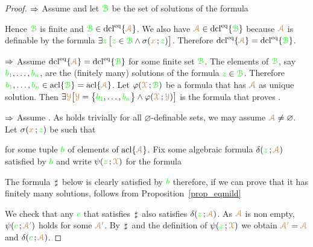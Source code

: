 \begin{proof}$\IMP$ Assume  and let ${\gr\B}$ be the set of solutions of the formula


Hence ${\gr\B}$ is finite and ${\gr\B}\in\dcl^\eq\{{\vl\Aa}\}$.
We also have ${\vl\Aa}\in\dcl^\eq\{{\gr\B}\}$ because ${\vl\Aa}$ is definable by the formula $\E{\gr z}\,\big[{\gr z}\in {\gr\B}\wedge \sigma({\mr x}\,;{\gr z})\big]$.
Therefore $\dcl^\eq\{{\vl\Aa}\}=\dcl^\eq\{{\gr\B}\}$.

$\IMP$ Assume $\dcl^\eq\{{\vl\Aa}\}=\dcl^\eq\{{\gr\B}\}$ for some finite set ${\gr\B}$.
The elements of ${\gr\B}$, say ${\gr b_1},\dots,{\gr b_n}$, are the (finitely many) solutions of the formula ${\gr z}\in{\gr\B}$.
Therefore ${\gr b_1},\dots,{\gr b_n}\in\acl\{{\gr\B}\}=\acl\{{\vl\Aa}\}$.
Let $\phi({\vl\X}\,;{\gr\B})$ be a formula that has ${\vl\Aa}$ as unique solution.
Then $\E{\vl\Y} \big[{\vl\Y}=\big\{{\gr b_1},\dots,{\gr b_n}\big\}\wedge \phi({\vl\X}\,;{\vl\Y})\big]$ is the formula that proves .

$\IMP$ Assume .
As  holds trivially for all $\varnothing$-definable sets, we may assume ${\vl\Aa}\neq\varnothing$.
Let $\sigma({\mr x}\,;{\gr z})$ be such that


for some tuple ${\gr b}$ of elements of $\acl\{{\vl\Aa}\}$.
Fix some algebraic formula $\delta({\gr z}\,;{\vl\Aa})$ satisfied by  ${\gr b}$ and write $\psi({\gr z}\,;{\vl\X})$ for the formula


The formula $\,\sharp\,$ below is clearly satisfied by ${\gr b}$ therefore, if we can prove that it has finitely many solutions,  follows from Proposition~\ref{prop_eqmild}


We check that any ${\gr c}$ that satisfies $\,\sharp\,$ also satisfies $\delta({\gr z}\,;{\vl\Aa})$.
As ${\vl\Aa}$ is non empty, $\psi({\gr c}\,;{\vl\Aa'})$ holds for some ${\vl\Aa'}$.
By $\,\sharp\,$ and the definition of $\psi({\gr z}\,;{\vl\X})$ we obtain ${\vl\Aa'}={\vl\Aa}$ and  $\delta({\gr c}\,;{\vl\Aa})$.
\end{proof}


